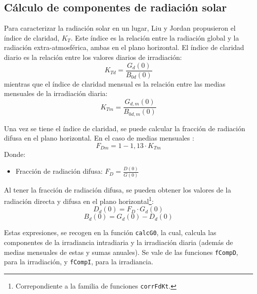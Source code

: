 \subsection{Cálculo de componentes de radiación solar}
\label{sec:org5b0c6f4}
\label{subsec:calculo-componentes-radiacion-solar}
Para caracterizar la radiación solar en un lugar, Liu y Jordan \cite{Liu.Jordan1960} propusieron el índice de claridad, \(K_T\). Este índice es la relación entre la radiación global y la radiación extra-atmosférica, ambas en el plano horizontal. El índice de claridad diario es la relación entre los valores diarios de irradiación: 
\begin{equation}
K_{Td}=\frac{G_d(0)}{B_{0d}(0)}
\label{eq:ind-cla-dia}
\end{equation}
mientras que el índice de claridad mensual es la relación entre las medias mensuales de la irradiación diaria:
\begin{equation}
K_{Tm}=\frac{G_{d,m}(0)}{B_{0d,m}(0)}
\label{eq:ind-cla-men}
\end{equation}

Una vez se tiene el índice de claridad, se puede calcular la fracción de radiación difusa en el plano horizontal. En el caso de medias mensuales \cite{Page1961}:
\begin{equation}
F_{Dm}=1-1,13\cdot K_{Tm}
\end{equation}
Donde:
\begin{itemize}
\item Fracción de radiación difusa: \(F_D=\frac{D(0)}{G(0)}\) 
 
\end{itemize}
Al tener la fracción de radiación difusa, se pueden obtener los valores de la radiación directa y difusa en el plano horizontal\footnote{Correpondiente a la familia de funciones \texttt{corrFdKt}.}:
\begin{equation}
D_d(0)=F_D\cdot G_d(0)
\label{dif-rad}
\end{equation}
\begin{equation}
B_d(0)=G_d(0)-D_d(0)
\label{dir-rad}
\end{equation}

Estas expresiones, se recogen en la función \texttt{calcG0}, la cual, calcula las componentes de la irradiancia intradiaria y la irradiación diaria (además de medias mensuales de estas y sumas anuales). Se vale de las funciones \texttt{fCompD}, para la irradiación, y \texttt{fCompI}, para la irradiancia. 

